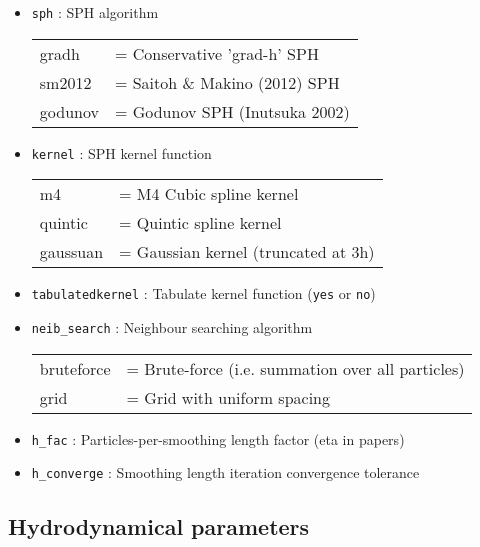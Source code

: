 \documentclass[a4paper]{article}
\newcommand{\var}[1]{\texttt{#1}}
\begin{document}
\begin{itemize}

\item \var{sph} : SPH algorithm \\
\begin{tabular}{ll}
gradh    & = Conservative 'grad-h' SPH \\
sm2012   & = Saitoh \& Makino (2012) SPH \\
godunov  & = Godunov SPH (Inutsuka 2002)
\end{tabular}

\item \var{kernel} : SPH kernel function \\
\begin{tabular}{ll}
m4        & = M4 Cubic spline kernel \\
quintic   & = Quintic spline kernel \\
gaussuan  & = Gaussian kernel (truncated at 3h)
\end{tabular}

\item \var{tabulatedkernel} : Tabulate kernel function  (\var{yes} or \var{no})

\item \var{neib\_search} : Neighbour searching algorithm \\
\begin{tabular}{ll}
bruteforce & = Brute-force (i.e. summation over all particles) \\
grid       & = Grid with uniform spacing
\end{tabular}

\item \var{h\_fac}     : Particles-per-smoothing length factor (eta in papers)

\item \var{h\_converge} : Smoothing length iteration convergence tolerance

\end{itemize}


\subsection{Hydrodynamical parameters}
\end{document}
